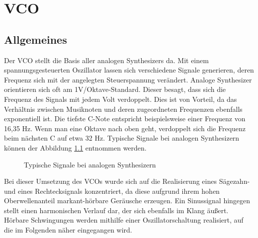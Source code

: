 \chapter{VCO}
\label{ch:VCO}
\section{Allgemeines}

Der VCO stellt die Basis aller analogen Synthesizers da. 
Mit einem spannungsgesteuerten Oszillator lassen sich verschiedene Signale generieren, deren Frequenz sich mit der angelegten Steuerspannung verändert.
Analoge Synthesizer orientieren sich oft am 1V/Oktave-Standard.
Dieser besagt, dass sich die Frequenz des Signals mit jedem Volt verdoppelt.
Dies ist von Vorteil, da das Verhältnis zwischen Musiknoten und deren zugeordneten Frequenzen ebenfalls exponentiell ist.
Die tiefste C-Note entspricht beispielsweise einer Frequenz von 16,35 Hz.
Wenn man eine Oktave nach oben geht, verdoppelt sich die Frequenz beim nächsten C auf etwa 32 Hz. Typische Signale bei analogen Synthesizern können der Abbildung \ref{fig:Waveforms} entnommen werden. \cite{MakeSynth}

\begin{figure}[h]
	\centering
	\setlength{\fboxsep}{1pt} %
	\setlength{\fboxrule}{1pt} %
	\caption{Typische Signale bei analogen Synthesizern \cite{MakeSynth}}
	\label{fig:Waveforms}
\end{figure}

Bei dieser Umsetzung des VCOs wurde sich auf die Realisierung eines Sägezahn- und eines Rechtecksignals konzentriert, da diese aufgrund ihrem hohen Oberwellenanteil markant-hörbare Geräusche erzeugen.
Ein Sinussignal hingegen stellt einen harmonischen Verlauf dar, der sich ebenfalls im Klang äußert.
Hörbare Schwingungen werden mithilfe einer Oszillatorschaltung realisiert, auf die im Folgenden näher eingegangen wird.

